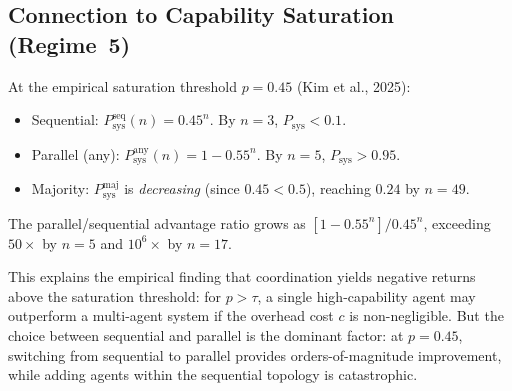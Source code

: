 \subsection{Connection to Capability Saturation (Regime~5)}

\begin{proposition}[Architecture Crossover at $p = 0.45$]
\label{prop:saturation-crossover}
At the empirical saturation threshold $p = 0.45$ (Kim et al., 2025):
\begin{itemize}
  \item Sequential: $P_{\mathrm{sys}}^{\mathrm{seq}}(n) = 0.45^n$. By $n = 3$, $P_{\mathrm{sys}} < 0.1$.
  \item Parallel (any): $P_{\mathrm{sys}}^{\mathrm{any}}(n) = 1 - 0.55^n$. By $n = 5$, $P_{\mathrm{sys}} > 0.95$.
  \item Majority: $P_{\mathrm{sys}}^{\mathrm{maj}}$ is \emph{decreasing} (since $0.45 < 0.5$),
    reaching $0.24$ by $n = 49$.
\end{itemize}
The parallel/sequential advantage ratio grows as $[1 - 0.55^n]/0.45^n$, exceeding $50\times$
by $n = 5$ and $10^6\times$ by $n = 17$.

\medskip\noindent
This explains the empirical finding that coordination yields negative returns above the
saturation threshold: for $p > \tau$, a single high-capability agent may outperform a
multi-agent system if the overhead cost $c$ is non-negligible. But the choice between
sequential and parallel is the dominant factor: at $p = 0.45$, switching from sequential
to parallel provides orders-of-magnitude improvement, while adding agents within the
sequential topology is catastrophic.
\end{proposition}
